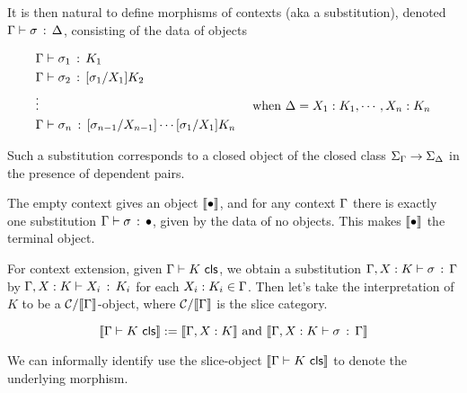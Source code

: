 \begin{multicols}{2}
  \color{syntax}{
  \[\CtxJdg{\Ga}\]}

  \color{semantics}{
  \[\bbrkt{\Ga} \in \CC\]
  }
\end{multicols}

It is then natural to define morphisms of contexts (aka a substitution),
denoted $\Gamma \vdash \sigma \, : \, \Delta$,
consisting of the data of objects

\begin{align*}
  &\Gamma \vdash \sigma_{1} \, : \, K_{1}\\
  &\Gamma \vdash \sigma_{2} \, : \, [\sigma_{1} / X_{1}] K_{2}\\
  &\vdots & \text{ when } \Delta = X_{1}:K_{1},\cdots, X_{n} : K_{n}\\
  &\Gamma \vdash \sigma_{n} \, : \, [\sigma_{n-1} / X_{n-1}] \cdots [\sigma_{1} / X_{1}] K_{n}
\end{align*}

Such a substitution corresponds to a closed object of the closed class
$\Sigma_{\Gamma} \to \Sigma_{\Delta}$ in the presence of dependent pairs.

\begin{multicols}{2}
  \color{syntax}{
  \[\ObjJdg{\Ga}{\si}{\De}\]}

  \color{semantics}{
  \[\bbrkt{\si} : \bbrkt{\Ga} \to \bbrkt{\De}\]
  }
\end{multicols}

The empty context gives an object $\llbracket \bullet \rrbracket$,
and for any context $\Gamma$ there is exactly one substitution $\Gamma \vdash \sigma \, : \, \bullet$,
given by the data of no objects.
This makes $\llbracket \bullet \rrbracket$ the terminal object.

\begin{multicols}{2}

  \color{semantics}{
  \[\TERM_{\CC} \in \CC\]
  }
\end{multicols}

For context extension, given $\Gamma \vdash K \,\, \mathsf{cls}$,
we obtain a substitution $\Gamma,X : K \vdash \sigma \, : \, \Gamma$
by $\Gamma,X : K \vdash X_{i} \, : \, K_{i}$ for each $X_{i} : K_{i} \in \Gamma$.
Then let's take the interpretation of $K$ to be a $\mathcal{C}/\llbracket \Gamma \rrbracket$-object,
where $\mathcal{C}/\llbracket \Gamma \rrbracket$ is the slice category.

\[ \llbracket \Gamma \vdash K \,\, \mathsf{cls} \rrbracket := \llbracket \Gamma,X : K \rrbracket \text{ and } \llbracket \Gamma,X : K \vdash \sigma \, : \, \Gamma \rrbracket\]

We can informally identify use the slice-object $\llbracket \Gamma \vdash K \,\, \mathsf{cls} \rrbracket$ to denote the underlying morphism.

